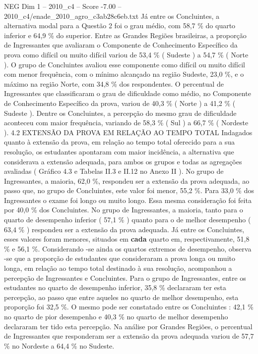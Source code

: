 \begin{textsample}{NEG Dim 1 – 2010\_c4 – Score -7.00 – 2010\_c4/enade\_2010\_agro\_c3ab28c6eb.txt}
Já entre os Concluintes, a alternativa modal para a Questão 2 foi o grau médio, com 58,7 \% do quarto inferior e 64,9 \% do superior.
Entre as Grandes Regiões brasileiras, a proporção de Ingressantes que avaliaram o Componente de Conhecimento Específico da prova como difícil ou muito difícil variou de 53,4 \% ( Sudeste ) a 54,7 \% ( Norte ).
O grupo de Concluintes avaliou esse componente como difícil ou muito difícil com menor frequência, com o mínimo alcançado na região Sudeste, 23,0 \%, e o máximo na região Norte, com 34,8 \% dos respondentes.
O percentual de Ingressantes que classificaram o grau de dificuldade como médio, no Componente de Conhecimento Específico da prova, variou de 40,3 \% ( Norte ) a 41,2 \% ( Sudeste ).
Dentre os Concluintes, a percepção do mesmo grau de dificuldade aconteceu com maior frequência, variando de 58,3 \% ( Sul ) a 66,7 \% ( Nordeste ). 4.2 EXTENSÃO DA PROVA EM RELAÇÃO AO TEMPO TOTAL Indagados quanto à extensão da prova, em relação ao tempo total oferecido para a sua resolução, os estudantes apontaram com maior incidência, a alternativa que considerava a extensão adequada, para ambos os grupos e todas as agregações avaliadas ( Gráfico 4.3 e Tabelas II.3 e II.12 no Anexo II ).
No grupo de Ingressantes, a maioria, 62,0 \%, respondeu ser a extensão da prova adequada, ao passo que, no grupo de Concluintes, este valor foi menor, 55,2 \%.
Para 33,0 \% dos Ingressantes o exame foi longo ou muito longo.
Essa mesma consideração foi feita por 40,0 \% dos Concluintes.
No grupo de Ingressantes, a maioria, tanto para o quarto de desempenho inferior ( 57,1 \% ) quanto para o de melhor desempenho ( 63,4 \% ) respondeu ser a extensão da prova adequada.
Já entre os Concluintes, esses valores foram menores, situados em \textbf{cada} quarto em, respectivamente, 51,8 \% e 56,1 \%.
Considerando -se ainda os quartos extremos de desempenho, observa -se que a proporção de estudantes que consideraram a prova longa ou muito longa, em relação ao tempo total destinado à sua resolução, acompanhou a percepção de Ingressantes e Concluintes.
Para o grupo de Ingressantes, entre os estudantes no quarto de desempenho inferior, 35,8 \% declararam ter esta percepção, ao passo que entre aqueles no quarto de melhor desempenho, esta proporção foi 32,5 \%.
O mesmo pode ser constatado entre os Concluintes : 42,1 \% no quarto de pior desempenho e 40,3 \% no quarto de melhor desempenho declararam ter tido esta percepção.
Na análise por Grandes Regiões, o percentual de Ingressantes que responderam ser a extensão da prova adequada variou de 57,7 \% no Nordeste a 64,4 \% no Sudeste.

\end{textsample}
